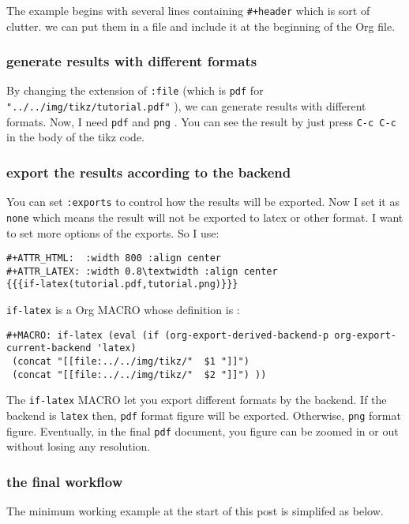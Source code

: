 \documentclass[koma,a4paper,utopia,10pt,listings-color,microtype,paralist,colorlinks]{org-article}
\begin{document}
The example begins with several lines containing \texttt{\#+header} which is sort of
clutter. we can put them in a file and include it at the beginning of the Org
file.
\subsubsection{generate results with different formats}
\label{sec:org75935d2}


By changing the extension of \texttt{:file} (which is \texttt{pdf} for
\texttt{"../../img/tikz/tutorial.pdf"} ), we can generate results with different formats.
Now, I need \texttt{pdf} and \texttt{png} . You can see the result by just press \texttt{C-c C-c} in the
body of the tikz code.
\subsubsection{export the results according to the backend}
\label{sec:org59da2c2}


You can set \texttt{:exports} to control how the results will be exported. Now I set it
as \texttt{none} which means the result will not be exported to latex or other format. I
want to set more options of the exports. So I use:

\begin{verbatim}
#+ATTR_HTML:  :width 800 :align center
#+ATTR_LATEX: :width 0.8\textwidth :align center
{{{if-latex(tutorial.pdf,tutorial.png)}}}
\end{verbatim}

\texttt{if-latex} is a Org MACRO whose definition is :
\begin{verbatim}
#+MACRO: if-latex (eval (if (org-export-derived-backend-p org-export-current-backend 'latex)
 (concat "[[file:../../img/tikz/"  $1 "]]")
 (concat "[[file:../../img/tikz/"  $2 "]]") ))
\end{verbatim}

The \texttt{if-latex} MACRO let you export different formats by the backend. If the
backend is \texttt{latex} then, \texttt{pdf} format figure will be exported. Otherwise, \texttt{png} format
figure. Eventually, in the final \texttt{pdf} document, you figure can be zoomed in or
out without losing any resolution.

\subsubsection{the final workflow}
\label{sec:orgc0cd8cc}


The minimum working example at the start of this post is simplifed as below.
\end{document}
